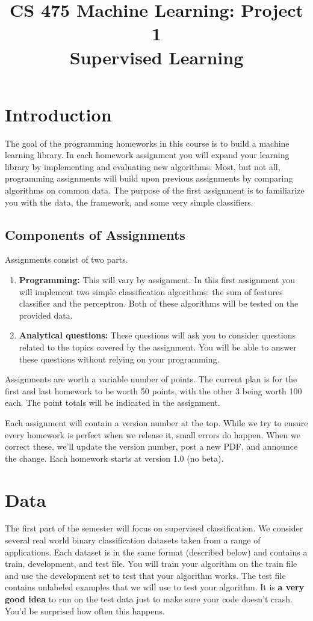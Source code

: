 \documentclass[11pt]{article}
\title{CS 475 Machine Learning: Project 1\\Supervised Learning\\}
\author{}
\date{}
\begin{document}
	\large
	\maketitle
	\thispagestyle{headings}
	
	\vspace{-.5in}
	
	\section{Introduction}
	The goal of the programming homeworks in this course is to build a machine learning library. In each homework assignment you will expand your learning library by implementing and evaluating new algorithms. Most, but not all, programming assignments will build upon previous assignments by comparing algorithms on common data. The purpose of the first assignment is to familiarize you with the data, the framework, and some very simple classifiers.
	
	\subsection{Components of Assignments}
	Assignments consist of two parts.
	\begin{enumerate}
		\item {\bf Programming:} This will vary by assignment.  In this first assignment you will implement two simple classification algorithms: the sum of features classifier and the perceptron.   Both of these algorithms will be tested on the provided data.
		\item {\bf Analytical questions:} These questions will ask you to consider questions related to the topics covered by the assignment. You will be able to answer these questions without relying on your programming.
	\end{enumerate}
	
	Assignments are worth a variable number of points.   The current plan is for the first and last homework to be worth 50 points, with the other 3 being worth 100 each. The point totals will be indicated in the assignment.
	
	Each assignment will contain a version number at the top. While we try to ensure every homework is perfect when we release it, small errors do happen. When we correct these, we'll update the version number, post a new PDF, and announce the change. Each homework starts at version 1.0 (no beta).
	
	\section{Data}
	The first part of the semester will focus on supervised classification. We consider several real world binary classification datasets taken from a range of applications. Each dataset is in the same format (described below) and contains a train, development, and test file. You will train your algorithm on the train file and use the development set to test that your algorithm works. The test file contains unlabeled examples that we will use to test your algorithm. It is {\bf a very good idea} to run on the test data just to make sure your code doesn't crash. You'd be surprised how often this happens.
	
\end{document}
